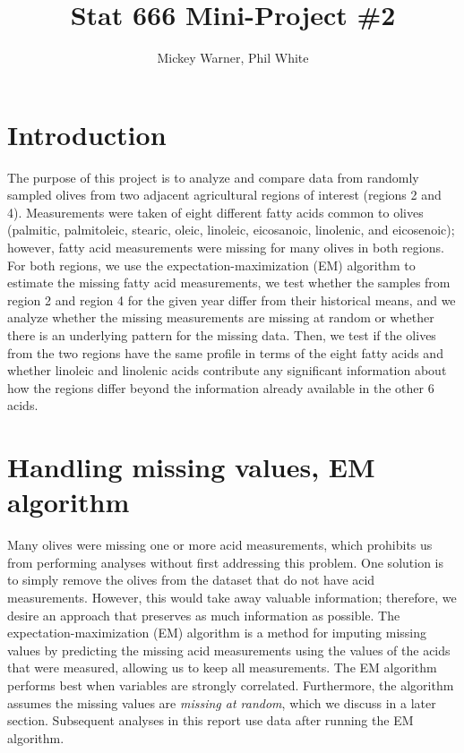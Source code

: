 \documentclass[11pt]{article}
\title{Stat 666 Mini-Project \#2}
\date{}
\author{Mickey Warner, Phil White}
\begin{document}
\maketitle
\vspace{-20mm}
\section*{Introduction}
\vspace{-4mm}
The purpose of this project is to analyze and compare data from randomly sampled olives from two adjacent agricultural regions of interest (regions 2 and 4). Measurements were taken of eight different fatty acids common to olives (palmitic, palmitoleic, stearic, oleic, linoleic, eicosanoic, linolenic, and eicosenoic); however, fatty acid measurements were missing for many olives in both regions. For both regions, we use the expectation-maximization (EM) algorithm to estimate the missing fatty acid measurements, we test whether the samples from region 2 and region 4 for the given year differ from their historical means, and we analyze whether the missing measurements are missing at random or whether there is an underlying pattern for the missing data.  Then, we test if the olives from the two regions have the same profile in terms of the eight fatty acids and whether linoleic and linolenic acids contribute any significant information about how the regions differ beyond the information already available in the other 6 acids.
\vspace{-4mm}

\section*{Handling missing values, EM algorithm}
\vspace{-4mm}
Many olives were missing one or more acid measurements, which prohibits us from performing analyses without first addressing this problem. One solution is to simply remove the olives from the dataset that do not have acid measurements. However, this would take away valuable information; therefore, we desire an approach that preserves as much information as possible. The expectation-maximization (EM) algorithm is a method for imputing missing values by predicting the missing acid measurements using the values of the acids that were measured, allowing us to keep all measurements. The EM algorithm performs best when variables are strongly correlated. Furthermore, the algorithm assumes the missing values are \emph{missing at random}, which we discuss in a later section.  Subsequent analyses in this report use data after running the EM algorithm.
\end{document}
